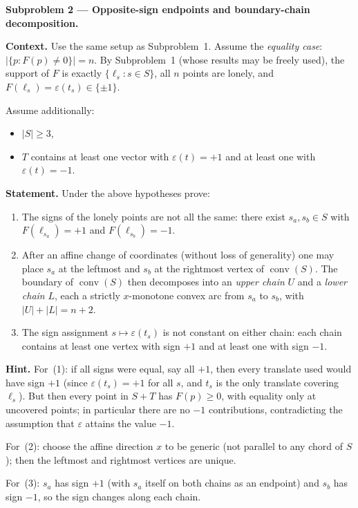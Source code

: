 \documentclass{article}
\begin{document}
\textbf{Subproblem 2 --- Opposite-sign endpoints and boundary-chain decomposition.}

\medskip
\textbf{Context.}
Use the same setup as Subproblem~1.  Assume the \emph{equality case}:
$|\{p:F(p)\neq 0\}|=n$.  By Subproblem~1 (whose results may be freely used),
the support of $F$ is exactly $\{\ell_s:s\in S\}$, all $n$ points are lonely,
and $F(\ell_s)=\varepsilon(t_s)\in\{\pm1\}$.

Assume additionally:
\begin{itemize}
  \item $|S|\ge 3$,
  \item $T$ contains at least one vector with $\varepsilon(t)=+1$ and at least one
        with $\varepsilon(t)=-1$.
\end{itemize}

\medskip
\textbf{Statement.}  Under the above hypotheses prove:
\begin{enumerate}
  \item The signs of the lonely points are not all the same: there exist
        $s_a, s_b\in S$ with $F(\ell_{s_a})=+1$ and $F(\ell_{s_b})=-1$.
  \item After an affine change of coordinates (without loss of generality) one
        may place $s_a$ at the leftmost and $s_b$ at the rightmost vertex of
        $\operatorname{conv}(S)$.  The boundary of $\operatorname{conv}(S)$ then
        decomposes into an \emph{upper chain} $U$ and a \emph{lower chain} $L$,
        each a strictly $x$-monotone convex arc from $s_a$ to $s_b$, with
        $|U|+|L|=n+2$.
  \item The sign assignment $s\mapsto \varepsilon(t_s)$ is not constant on
        either chain: each chain contains at least one vertex with sign $+1$
        and at least one with sign $-1$.
\end{enumerate}

\medskip
\textbf{Hint.}
For~(1): if all signs were equal, say all $+1$, then every translate used
would have sign $+1$ (since $\varepsilon(t_s)=+1$ for all $s$, and $t_s$ is
the only translate covering $\ell_s$).  But then every point in $S+T$ has
$F(p)\ge 0$, with equality only at uncovered points; in particular there are
no $-1$ contributions, contradicting the assumption that $\varepsilon$ attains
the value $-1$.

For~(2): choose the affine direction $x$ to be generic (not parallel to any
chord of $S$); then the leftmost and rightmost vertices are unique.

For~(3): $s_a$ has sign $+1$ (with $s_a$ itself on both chains as an endpoint)
and $s_b$ has sign $-1$, so the sign changes along each chain.
\end{document}
